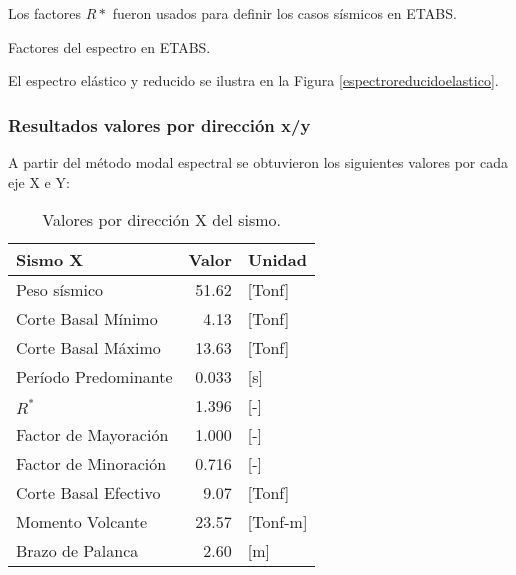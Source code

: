 Los factores $R*$ fueron usados para definir los casos sísmicos en ETABS. \\

\begin{images}{Factores del espectro en ETABS.}
\end{images}

El espectro elástico y reducido se ilustra en la Figura \ref{espectroreducidoelastico}.


\subsubsection{Resultados valores por dirección x/y}

A partir del método modal espectral se obtuvieron los siguientes valores por cada eje X e Y:

\begin{table}[H]
  \centering
  \caption{Valores por dirección X del sismo.}
  \begin{tabular}{lrl}
    \hline
    \textbf{Sismo X} & \multicolumn{1}{c}{\textbf{Valor}} & \multicolumn{1}{c}{\textbf{Unidad}} \bigstrut\\
    \hline
    Peso sísmico & 51.62 & [Tonf] \bigstrut[t]\\
    Corte Basal Mínimo & 4.13  & [Tonf] \\
    Corte Basal Máximo & 13.63 & [Tonf] \\
    Período Predominante & 0.033 & [s] \\
    $R^*$ & 1.396 & [-] \\
    Factor de Mayoración & 1.000 & [-] \\
    Factor de Minoración & 0.716 & [-] \\
    Corte Basal Efectivo & 9.07  & [Tonf] \\
    Momento Volcante & 23.57 & [Tonf-m] \\
    Brazo de Palanca & 2.60  & [m] \bigstrut[b]\\
    \hline
  \end{tabular}
\end{table}

